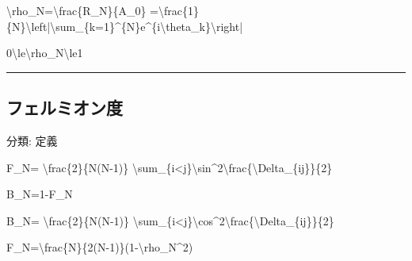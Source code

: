 \documentclass[
  a4paper,
]{ltjsarticle}
\newenvironment{Shaded}{}{}
\newcommand{\NormalTok}[1]{#1}
\begin{document}
\begin{Shaded}
\begin{Highlighting}[]
\NormalTok{\textbackslash{}rho\_N=\textbackslash{}frac\{R\_N\}\{A\_0\}}
\NormalTok{=\textbackslash{}frac\{1\}\{N\}\textbackslash{}left|\textbackslash{}sum\_\{k=1\}\^{}\{N\}e\^{}\{i\textbackslash{}theta\_k\}\textbackslash{}right|}
\end{Highlighting}
\end{Shaded}

\begin{Shaded}
\begin{Highlighting}[]
\NormalTok{0\textbackslash{}le\textbackslash{}rho\_N\textbackslash{}le1}
\end{Highlighting}
\end{Shaded}

\begin{center}\rule{0.5\linewidth}{0.5pt}\end{center}

\subsection{フェルミオン度}\label{ux30d5ux30a7ux30ebux30dfux30aaux30f3ux5ea6}

分類: 定義

\begin{Shaded}
\begin{Highlighting}[]
\NormalTok{F\_N=}
\NormalTok{\textbackslash{}frac\{2\}\{N(N{-}1)\}}
\NormalTok{\textbackslash{}sum\_\{i\textless{}j\}\textbackslash{}sin\^{}2\textbackslash{}frac\{\textbackslash{}Delta\_\{ij\}\}\{2\}}
\end{Highlighting}
\end{Shaded}

\begin{Shaded}
\begin{Highlighting}[]
\NormalTok{B\_N=1{-}F\_N}
\end{Highlighting}
\end{Shaded}

\begin{Shaded}
\begin{Highlighting}[]
\NormalTok{B\_N=}
\NormalTok{\textbackslash{}frac\{2\}\{N(N{-}1)\}}
\NormalTok{\textbackslash{}sum\_\{i\textless{}j\}\textbackslash{}cos\^{}2\textbackslash{}frac\{\textbackslash{}Delta\_\{ij\}\}\{2\}}
\end{Highlighting}
\end{Shaded}

\begin{Shaded}
\begin{Highlighting}[]
\NormalTok{F\_N=\textbackslash{}frac\{N\}\{2(N{-}1)\}(1{-}\textbackslash{}rho\_N\^{}2)}
\end{Highlighting}
\end{Shaded}
\end{document}
